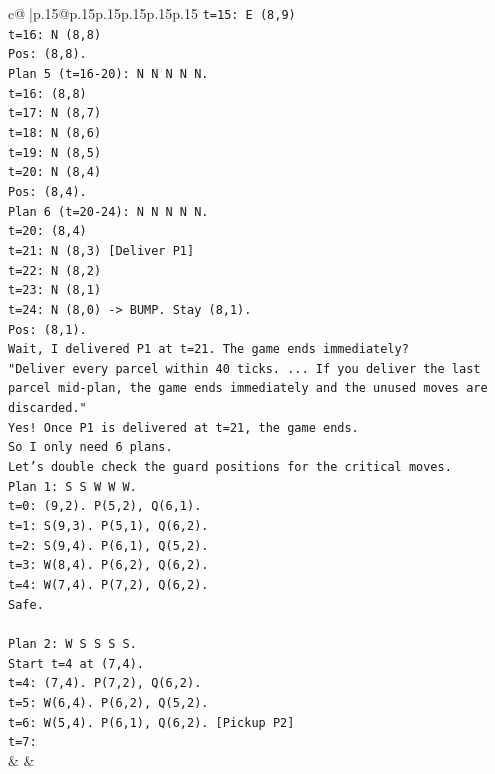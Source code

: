 \documentclass{article}
\begin{document}
{\begin{supertabular}{c@{$\;$}|p{.15\linewidth}@{}p{.15\linewidth}p{.15\linewidth}p{.15\linewidth}p{.15\linewidth}p{.15\linewidth}}
{{{\texttt{t=15: E (8,9)} \\
\texttt{t=16: N (8,8)} \\
\texttt{Pos: (8,8).} \\
\texttt{Plan 5 (t=16{-}20): N N N N N.} \\
\texttt{t=16: (8,8)} \\
\texttt{t=17: N (8,7)} \\
\texttt{t=18: N (8,6)} \\
\texttt{t=19: N (8,5)} \\
\texttt{t=20: N (8,4)} \\
\texttt{Pos: (8,4).} \\
\texttt{Plan 6 (t=20{-}24): N N N N N.} \\
\texttt{t=20: (8,4)} \\
\texttt{t=21: N (8,3) {[}Deliver P1{]}} \\
\texttt{t=22: N (8,2)} \\
\texttt{t=23: N (8,1)} \\
\texttt{t=24: N (8,0) {-}> BUMP. Stay (8,1).} \\
\texttt{Pos: (8,1).} \\
\texttt{Wait, I delivered P1 at t=21. The game ends immediately?} \\
\texttt{"Deliver every parcel within 40 ticks. ... If you deliver the last parcel mid{-}plan, the game ends immediately and the unused moves are discarded."} \\
\texttt{Yes! Once P1 is delivered at t=21, the game ends.} \\
\texttt{So I only need 6 plans.} \\
\texttt{Let's double check the guard positions for the critical moves.} \\
\texttt{Plan 1: S S W W W.} \\
\texttt{t=0: (9,2). P(5,2), Q(6,1).} \\
\texttt{t=1: S(9,3). P(5,1), Q(6,2).} \\
\texttt{t=2: S(9,4). P(6,1), Q(5,2).} \\
\texttt{t=3: W(8,4). P(6,2), Q(6,2).} \\
\texttt{t=4: W(7,4). P(7,2), Q(6,2).} \\
\texttt{Safe.} \\
\\ 
\texttt{Plan 2: W S S S S.} \\
\texttt{Start t=4 at (7,4).} \\
\texttt{t=4: (7,4). P(7,2), Q(6,2).} \\
\texttt{t=5: W(6,4). P(6,2), Q(5,2).} \\
\texttt{t=6: W(5,4). P(6,1), Q(6,2). {[}Pickup P2{]}} \\
\texttt{t=7:} \\
            }
        }
    }
    & & \\ \\


\end{supertabular}}
\end{document}
